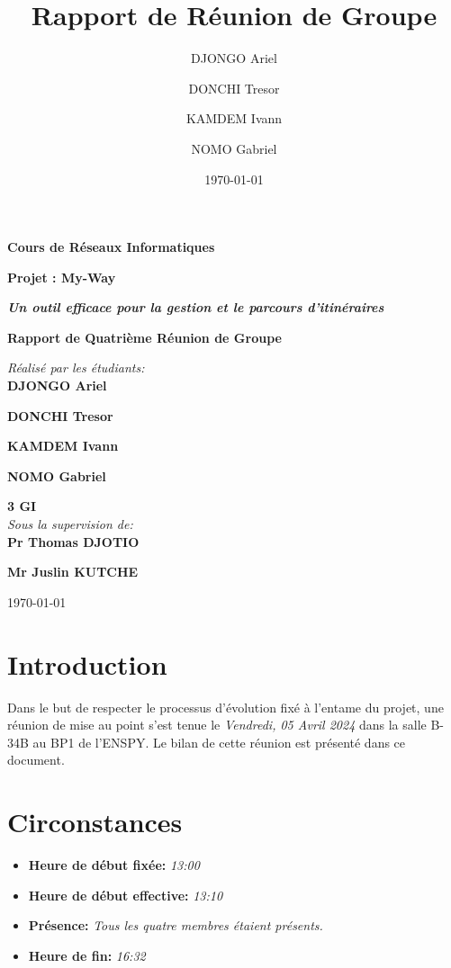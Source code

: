 \documentclass[12px]{article}
\title{Rapport de Réunion de Groupe}
\author{DJONGO Ariel\and DONCHI Tresor \and KAMDEM Ivann \and NOMO Gabriel}
\date{\today}
\begin{document}
\begin{titlepage}
    \centering
    \vspace*{1cm}
    \Large\textbf{Cours de Réseaux Informatiques}\par
    \vspace{0.5cm}
    \Large\textbf{Projet : My-Way}\par
    \vspace{0.5cm}
    \Large\textbf{\textit{Un outil efficace pour la gestion et le parcours d'itinéraires}}\par
    \vspace{1cm}
    \vspace{1cm}
    \Large\textbf{Rapport de Quatrième Réunion de Groupe}\par
    \vspace{1cm}
    \textit{Réalisé par les étudiants:\\}
    \textbf{DJONGO Ariel}\par
    \textbf{DONCHI Tresor}\par
    \textbf{KAMDEM Ivann}\par
    \textbf{NOMO Gabriel}\par
    \vspace{0.6cm}\par
    \textbf{3 GI\\}
    \vspace{0.4cm}
    \textit{Sous la supervision de:\\}
    \textbf{Pr Thomas DJOTIO}\par
    \textbf{Mr Juslin KUTCHE}\par
    \vspace{6cm}
    \today\par
    \vfill
\end{titlepage}

\tableofcontents
\clearpage


\section{Introduction}
Dans le but de respecter le processus d'évolution fixé à l'entame du projet, une réunion de mise au point s'est tenue le \textit{Vendredi, 05 Avril 2024} dans la salle B-34B au BP1 de l'ENSPY.
Le bilan de cette réunion est présenté dans ce document.

\newpage
\section{Circonstances}
\begin{itemize}
    \item \textbf{Heure de début fixée:} \textit{13:00}
    \item \textbf{Heure de début effective:} \textit{13:10}
    \item \textbf{Présence:} \textit{Tous les quatre membres étaient présents.}
    \item \textbf{Heure de fin:} \textit{16:32}
\end{itemize}
\end{document}
